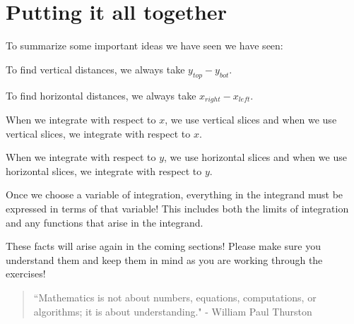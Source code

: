 \documentclass{ximera}
\begin{document}
\section{Putting it all together}
 To summarize some important ideas we have seen we have seen:


\begin{fact}
To find vertical distances, we always take $y_{top} - y_{bot}$.

To find horizontal distances, we always take $x_{right}-x_{left}$.
\end{fact}

\begin{fact}
When we integrate with respect to $x$, we use vertical slices and when we use vertical slices, we integrate with respect to $x$.

When we integrate with respect to $y$, we use horizontal slices and when we use horizontal slices, we integrate with respect to $y$.
\end{fact}

\begin{fact}
Once we choose a variable of integration, everything in the integrand must be expressed in terms of that variable!  This includes both the limits of integration and any functions that arise in the integrand.
\end{fact}

These facts will arise again in the coming sections!  Please make sure you understand them and keep them in mind as you are working through the exercises!

\begin{quote}
``Mathematics is not about numbers, equations, computations, or algorithms; it is about understanding." - William Paul Thurston

\end{quote}
\end{document}

